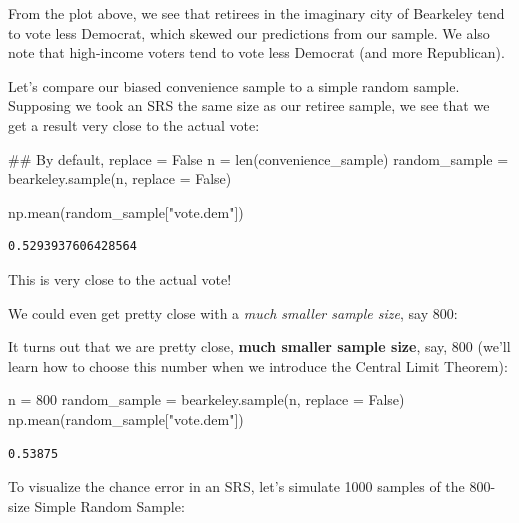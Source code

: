 \documentclass[
  letterpaper,
  DIV=11,
  numbers=noendperiod]{scrreprt}
\newenvironment{Shaded}{\begin{snugshade}}{\end{snugshade}}
\newcommand{\BuiltInTok}[1]{\textcolor[rgb]{0.00,0.23,0.31}{#1}}
\newcommand{\CommentTok}[1]{\textcolor[rgb]{0.37,0.37,0.37}{#1}}
\newcommand{\DecValTok}[1]{\textcolor[rgb]{0.68,0.00,0.00}{#1}}
\newcommand{\NormalTok}[1]{\textcolor[rgb]{0.00,0.23,0.31}{#1}}
\newcommand{\OperatorTok}[1]{\textcolor[rgb]{0.37,0.37,0.37}{#1}}
\newcommand{\StringTok}[1]{\textcolor[rgb]{0.13,0.47,0.30}{#1}}
\newcommand{\VariableTok}[1]{\textcolor[rgb]{0.07,0.07,0.07}{#1}}
\begin{document}
From the plot above, we see that retirees in the imaginary city of
Bearkeley tend to vote less Democrat, which skewed our predictions from
our sample. We also note that high-income voters tend to vote less
Democrat (and more Republican).

Let's compare our biased convenience sample to a simple random sample.
Supposing we took an SRS the same size as our retiree sample, we see
that we get a result very close to the actual vote:

\begin{Shaded}
\begin{Highlighting}[]
\CommentTok{\#\# By default, replace = False}
\NormalTok{n }\OperatorTok{=} \BuiltInTok{len}\NormalTok{(convenience\_sample)}
\NormalTok{random\_sample }\OperatorTok{=}\NormalTok{ bearkeley.sample(n, replace }\OperatorTok{=} \VariableTok{False}\NormalTok{)}

\NormalTok{np.mean(random\_sample[}\StringTok{"vote.dem"}\NormalTok{])}
\end{Highlighting}
\end{Shaded}

\begin{verbatim}
0.5293937606428564
\end{verbatim}

This is very close to the actual vote!

We could even get pretty close with a \emph{much smaller sample size},
say 800:

It turns out that we are pretty close, \textbf{much smaller sample
size}, say, 800 (we'll learn how to choose this number when we introduce
the Central Limit Theorem):

\begin{Shaded}
\begin{Highlighting}[]
\NormalTok{n }\OperatorTok{=} \DecValTok{800}
\NormalTok{random\_sample }\OperatorTok{=}\NormalTok{ bearkeley.sample(n, replace }\OperatorTok{=} \VariableTok{False}\NormalTok{)}
\NormalTok{np.mean(random\_sample[}\StringTok{"vote.dem"}\NormalTok{])}
\end{Highlighting}
\end{Shaded}

\begin{verbatim}
0.53875
\end{verbatim}

To visualize the chance error in an SRS, let's simulate 1000 samples of
the 800-size Simple Random Sample:
\end{document}
